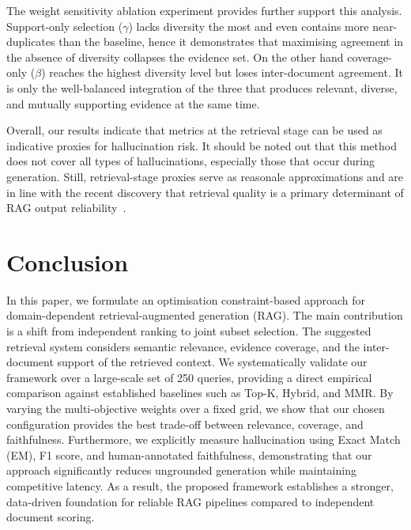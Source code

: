 \documentclass[conference]{IEEEtran}
\begin{document}
The weight sensitivity ablation experiment provides further support this analysis. Support-only selection ($\gamma$) lacks diversity the most and even contains more near-duplicates than the baseline, hence it demonstrates that maximising agreement in the absence of diversity collapses the evidence set. On the other hand coverage-only ($\beta$) reaches the highest diversity level but loses inter-document agreement. It is only the well-balanced integration of the three that produces relevant, diverse, and mutually supporting evidence at the same time.

Overall, our results indicate that metrics at the retrieval stage can be used as indicative proxies for hallucination risk. It should be noted out that this method does not cover all types of hallucinations, especially those that occur during generation. Still, retrieval-stage proxies serve as reasonale approximations and are in line with the recent discovery that retrieval quality is a primary determinant of RAG output reliability~\cite{1,8}.

\section{Conclusion}

In this paper, we formulate an optimisation constraint-based approach for domain-dependent retrieval-augmented generation (RAG). The main contribution is a shift from independent ranking to joint subset selection. The suggested retrieval system considers semantic relevance, evidence coverage, and the inter-document support of the retrieved context. We systematically validate our framework over a large-scale set of 250 queries, providing a direct empirical comparison against established baselines such as Top-K, Hybrid, and MMR. By varying the multi-objective weights over a fixed grid, we show that our chosen configuration provides the best trade-off between relevance, coverage, and faithfulness. Furthermore, we explicitly measure hallucination using Exact Match (EM), F1 score, and human-annotated faithfulness, demonstrating that our approach significantly reduces ungrounded generation while maintaining competitive latency. As a result, the proposed framework establishes a stronger, data-driven foundation for reliable RAG pipelines compared to independent document scoring.
\end{document}
